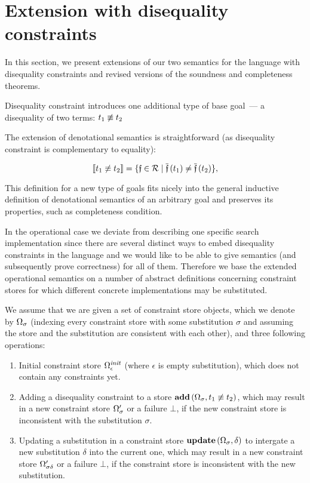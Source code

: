 \section{Extension with disequality constraints}
\label{sec:extension}

In this section, we present extensions of our two semantics for the language with disequality constraints and revised versions of the soundness and completeness theorems.

Disequality constraint introduces one additional type of base goal~--- a disequality of two terms: $t_1 \not\equiv t_2$

The extension of denotational semantics is straightforward (as disequality constraint is complementary to equality):

\[ \llbracket{t_1 \not\equiv t_2}\rrbracket  =  \{\mathfrak{f} \in \mathcal{R} \mid \overline{\mathfrak{f}}\,(t_1) \neq \overline{\mathfrak{f}}\,(t_2)\}, \]

This definition for a new type of goals fits nicely into the general inductive definition of denotational semantics of an arbitrary goal
and preserves its properties, such as completeness condition.

In the operational case we deviate from describing one specific search implementation since there are several distinct ways to embed disequality constraints
in the language and we would like to be able to give semantics (and subsequently prove correctness) for all of them. Therefore we base the extended operational
semantics on a number of abstract definitions concerning constraint stores for which different concrete implementations may be substituted.

We assume that we are given a set of constraint store objects, which we denote by $\Omega_\sigma$ (indexing every constraint store with
some substitution $\sigma$ and assuming the store and the substitution are consistent with each other), and three following operations:

\begin{enumerate}
\item Initial constraint store $\Omega_\epsilon^{\mathit{init}}$ (where $\epsilon$ is empty substitution), which does not contain any constraints yet.
\item Adding a disequality constraint to a store $\mathbf{add}\,(\Omega_\sigma, t_1 \not\equiv t_2)$, which may result in a new constraint store $\Omega^\prime_\sigma$ or a failure $\bot$,
  if the new constraint store is inconsistent with the substitution $\sigma$.
\item Updating a substitution in a constraint store $\mathbf{update}\,(\Omega_\sigma, \delta)$ to intergate a new substitution $\delta$ into the current one,
  which may result in a new constraint store $\Omega^\prime_{\sigma \delta}$ or a failure $\bot$, if the constraint store is inconsistent with the new substitution.
\end{enumerate}

